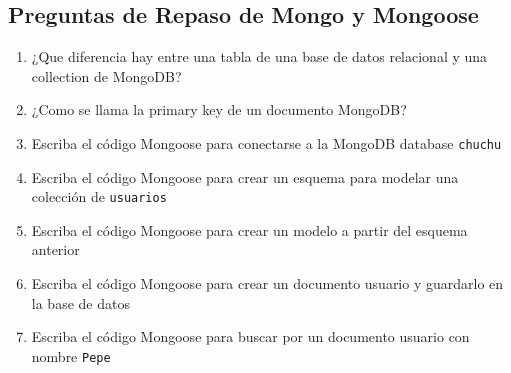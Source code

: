 \subsection{Preguntas de Repaso de Mongo y
Mongoose}\label{preguntas-de-repaso-de-mongo-y-mongoose}

\begin{enumerate}
\def\labelenumi{\arabic{enumi}.}
\item
  ¿Que diferencia hay entre una tabla de una base de datos relacional y
  una collection de MongoDB?
\item
  ¿Como se llama la primary key de un documento MongoDB?
\item
  Escriba el código Mongoose para conectarse a la MongoDB database
  \texttt{chuchu}
\item
  Escriba el código Mongoose para crear un esquema para modelar una
  colección de \texttt{usuarios}
\item
  Escriba el código Mongoose para crear un modelo a partir del esquema
  anterior
\item
  Escriba el código Mongoose para crear un documento usuario y guardarlo
  en la base de datos
\item
  Escriba el código Mongoose para buscar por un documento usuario con
  nombre \texttt{\textquotesingle{}Pepe\textquotesingle{}}
\end{enumerate}
